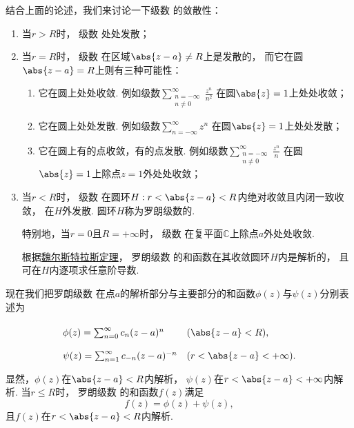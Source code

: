 结合上面的论述，我们来讨论一下级数  的敛散性：
\begin{enumerate}
	\item 当\(r > R\)时，
	级数  处处发散；

	\item 当\(r = R\)时，
	级数  在区域\(\abs{z-a} \neq R\)上是发散的，
	而它在圆\(\abs{z-a}=R\)上则有三种可能性：
	\begin{enumerate}
		\item 它在圆上处处收敛.
		例如级数\(\sum_{\substack{n=-\infty \\ n\neq0}}^\infty \frac{z^n}{n^2}\)
		在圆\(\abs{z}=1\)上处处收敛；

		\item 它在圆上处处发散.
		例如级数\(\sum_{n=-\infty}^\infty z^n\)
		在圆\(\abs{z}=1\)上处处发散；

		\item 它在圆上有的点收敛，有的点发散.
		例如级数\(\sum_{\substack{n=-\infty \\ n\neq0}}^\infty \frac{z^n}{n}\)
		在圆\(\abs{z}=1\)上除点\(z=1\)外处处收敛；
	\end{enumerate}

	\item 当\(r < R\)时，
	级数 
	在圆环\(H: r < \abs{z-a} < R\)内绝对收敛且内闭一致收敛，
	在\(H\)外发散.
	圆环\(H\)称为罗朗级数的.

	特别地，当\(r = 0\)且\(R = +\infty\)时，
	级数 
	在复平面\(\mathbb{C}\)上除点\(a\)外处处收敛.

	根据\hyperref[theorem:解析函数的级数表示.魏尔斯特拉斯定理]{魏尔斯特拉斯定理}，
	罗朗级数  的和函数在其收敛圆环\(H\)内是解析的，
	且可在\(H\)内逐项求任意阶导数.
\end{enumerate}

现在我们把罗朗级数 
在点\(a\)的解析部分与主要部分的和函数\(\phi(z)\)与\(\psi(z)\)分别表述为\[
	\def\arraystretch{2}
	\begin{array}{ll}
		\phi(z) = \sum_{n=0}^\infty c_n (z-a)^n & (\abs{z-a}<R), \\
		\psi(z) = \sum_{n=1}^\infty c_{-n} (z-a)^{-n} & (r < \abs{z-a} < +\infty).
	\end{array}
\]
显然，\(\phi(z)\)在\(\abs{z-a}<R\)内解析，
\(\psi(z)\)在\(r<\abs{z-a}<+\infty\)内解析.
当\(r \leq R\)时，
罗朗级数  的和函数\(f(z)\)满足\[
	f(z) = \phi(z) + \psi(z),
\]
且\(f(z)\)在\(r<\abs{z-a}<R\)内解析.

